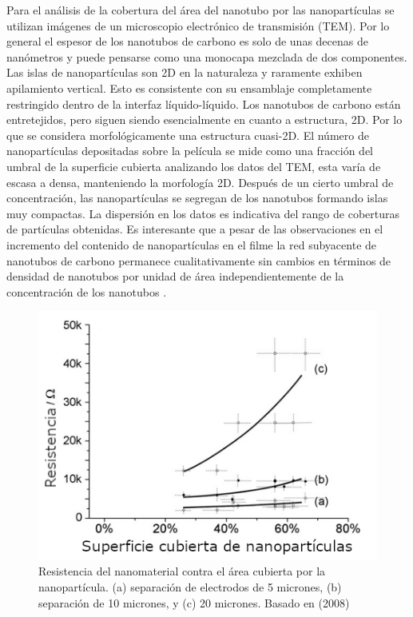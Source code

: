 \documentclass{elsarticle}
\begin{document}
Para el análisis de la cobertura del área del nanotubo por las nanopartículas se utilizan imágenes de un microscopio electrónico de transmisión (TEM). Por lo general el espesor de los nanotubos de carbono es solo de unas decenas de nanómetros y puede pensarse como una monocapa mezclada de dos componentes. Las islas de nanopartículas son 2D en la naturaleza y raramente exhiben apilamiento vertical. Esto es consistente con su ensamblaje completamente restringido dentro de la interfaz líquido-líquido. Los nanotubos de carbono están entretejidos, pero siguen siendo esencialmente en cuanto a estructura, 2D. Por lo que se considera morfológicamente una estructura cuasi-2D. El número de nanopartículas depositadas sobre la película se mide como una fracción del umbral de la superficie cubierta analizando los datos del TEM, esta varía de escasa a densa, manteniendo la morfología 2D. Después de un cierto umbral de concentración, las nanopartículas se segregan de los nanotubos formando islas muy compactas. La dispersión en los datos es indicativa del rango de coberturas de partículas obtenidas. Es interesante que a pesar de las observaciones en el incremento del contenido de nanopartículas en el filme la red subyacente de nanotubos de carbono permanece cualitativamente sin cambios en términos de densidad de nanotubos por unidad de área independientemente de la concentración de los nanotubos \cite{Marshgrap}.


\begin{figure}[ht!]
	\centering
		\includegraphics[scale=2]{graficaarea.png}
	\caption{Resistencia del nanomaterial contra el área cubierta por la nanopartícula. (a) separación de electrodos de 5 micrones, (b) separación de 10 micrones, y (c) 20 micrones. Basado en \citet{Marshgrap} (2008)}
	\label{fig2}
\end{figure}
\end{document}
